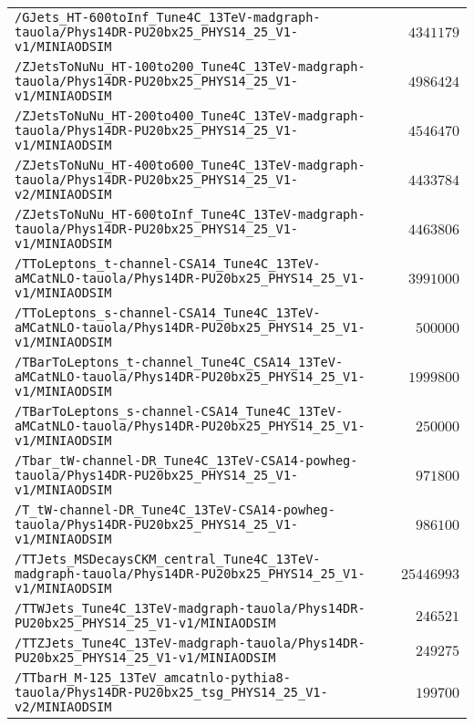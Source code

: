 \begin{center}
\begin{tabular}{lr}
\verb!/GJets_HT-600toInf_Tune4C_13TeV-madgraph-tauola/Phys14DR-PU20bx25_PHYS14_25_V1-v1/MINIAODSIM! &$ 4341179$\tabularnewline
\verb!/ZJetsToNuNu_HT-100to200_Tune4C_13TeV-madgraph-tauola/Phys14DR-PU20bx25_PHYS14_25_V1-v1/MINIAODSIM! &$ 4986424$\tabularnewline
\verb!/ZJetsToNuNu_HT-200to400_Tune4C_13TeV-madgraph-tauola/Phys14DR-PU20bx25_PHYS14_25_V1-v1/MINIAODSIM! &$ 4546470$\tabularnewline
\verb!/ZJetsToNuNu_HT-400to600_Tune4C_13TeV-madgraph-tauola/Phys14DR-PU20bx25_PHYS14_25_V1-v2/MINIAODSIM! &$ 4433784$\tabularnewline
\verb!/ZJetsToNuNu_HT-600toInf_Tune4C_13TeV-madgraph-tauola/Phys14DR-PU20bx25_PHYS14_25_V1-v1/MINIAODSIM! &$ 4463806$\tabularnewline
\verb!/TToLeptons_t-channel-CSA14_Tune4C_13TeV-aMCatNLO-tauola/Phys14DR-PU20bx25_PHYS14_25_V1-v1/MINIAODSIM! &$ 3991000$\tabularnewline
\verb!/TToLeptons_s-channel-CSA14_Tune4C_13TeV-aMCatNLO-tauola/Phys14DR-PU20bx25_PHYS14_25_V1-v1/MINIAODSIM! &$  500000$\tabularnewline
\verb!/TBarToLeptons_t-channel_Tune4C_CSA14_13TeV-aMCatNLO-tauola/Phys14DR-PU20bx25_PHYS14_25_V1-v1/MINIAODSIM! &$ 1999800$\tabularnewline
\verb!/TBarToLeptons_s-channel-CSA14_Tune4C_13TeV-aMCatNLO-tauola/Phys14DR-PU20bx25_PHYS14_25_V1-v1/MINIAODSIM! &$  250000$\tabularnewline
\verb!/Tbar_tW-channel-DR_Tune4C_13TeV-CSA14-powheg-tauola/Phys14DR-PU20bx25_PHYS14_25_V1-v1/MINIAODSIM! &$  971800$\tabularnewline
\verb!/T_tW-channel-DR_Tune4C_13TeV-CSA14-powheg-tauola/Phys14DR-PU20bx25_PHYS14_25_V1-v1/MINIAODSIM! &$  986100$\tabularnewline
\verb!/TTJets_MSDecaysCKM_central_Tune4C_13TeV-madgraph-tauola/Phys14DR-PU20bx25_PHYS14_25_V1-v1/MINIAODSIM! &$25446993$\tabularnewline
\verb!/TTWJets_Tune4C_13TeV-madgraph-tauola/Phys14DR-PU20bx25_PHYS14_25_V1-v1/MINIAODSIM! &$  246521$\tabularnewline
\verb!/TTZJets_Tune4C_13TeV-madgraph-tauola/Phys14DR-PU20bx25_PHYS14_25_V1-v1/MINIAODSIM! &$  249275$\tabularnewline
\verb!/TTbarH_M-125_13TeV_amcatnlo-pythia8-tauola/Phys14DR-PU20bx25_tsg_PHYS14_25_V1-v2/MINIAODSIM! &$  199700$\tabularnewline
\hline
\end{tabular}\end{center}
